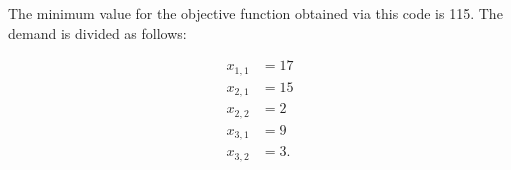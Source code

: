 

The minimum value for the objective function obtained via this code is 115. The
demand is divided as follows:

\begin{align*}
	x_{1,1} &= 17 \\
	x_{2,1} &= 15 \\
	x_{2,2} &= 2 \\
	x_{3,1} &= 9 \\
	x_{3,2} &= 3
.\end{align*}
